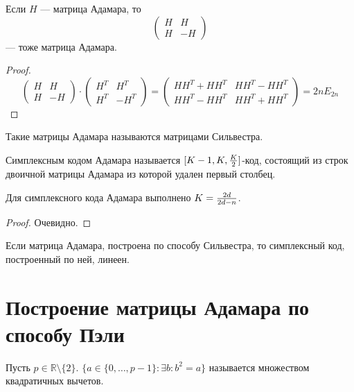 \begin{proposition}
Если $H$ --- матрица Адамара, то
$$\begin{pmatrix} H & H \\ H & -H \end{pmatrix}$$ --- тоже матрица Адамара.
\end{proposition}
\begin{proof}
$$\begin{pmatrix} H & H \\ H & -H \end{pmatrix} \cdot
   \begin{pmatrix} H^{T} & H^{T} \\ H^{T} & -H^{T} \end{pmatrix}
   = \begin{pmatrix} H H^{T} + H H^{T} & H H^{T} - H H^{T} \\
                      H H^{T} - H H^{T} & H H^{T} + H H^{T}\end{pmatrix} = 2n E_{2n}$$
\end{proof}

Такие матрицы Адамара называются матрицами Сильвестра.

\begin{definition}
Симплексным кодом Адамара называется $[K-1, K, {K \over 2}]$-код, состоящий
из строк двоичной матрицы Адамара из которой удален первый столбец.
\end{definition}

\begin{proposition}
Для симплексного кода Адамара выполнено $K = {2d \over 2d - n}$.
\end{proposition}
\begin{proof}
Очевидно.
\end{proof}

\begin{remark}
Если матрица Адамара, построена по способу Сильвестра, то симплексный код, 
построенный по ней, линеен.
\end{remark}

\section{Построение матрицы Адамара по способу Пэли}

\begin{definition}
Пусть $p \in \mathbb{R} \setminus \{2\}$. $\{a \in \{0,\ldots, p-1\}
  \colon \exists b \colon b^2 = a \}$ называется множеством
  квадратичных вычетов.
\end{definition}

